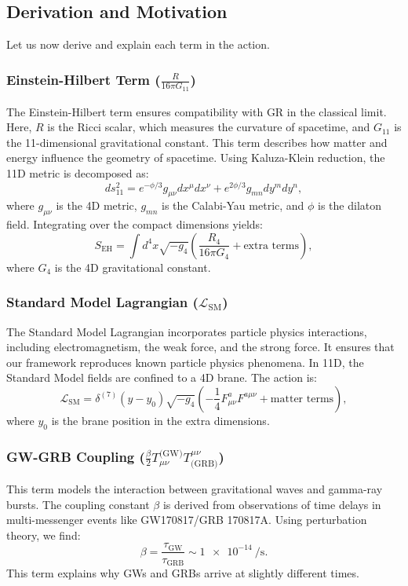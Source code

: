 \documentclass[12pt, a4paper]{article}
\begin{document}
\subsection{Derivation and Motivation}
Let us now derive and explain each term in the action.

\subsubsection{Einstein-Hilbert Term ($\frac{R}{16\pi G_{11}}$)}
The Einstein-Hilbert term ensures compatibility with GR in the classical limit. Here, \(R\) is the Ricci scalar, which measures the curvature of spacetime, and \(G_{11}\) is the 11-dimensional gravitational constant. This term describes how matter and energy influence the geometry of spacetime. Using Kaluza-Klein reduction, the 11D metric is decomposed as:
\[
ds^2_{11} = e^{-\phi/3} g_{\mu\nu}dx^\mu dx^\nu + e^{2\phi/3} g_{mn}dy^m dy^n,
\]
where \(g_{\mu\nu}\) is the 4D metric, \(g_{mn}\) is the Calabi-Yau metric, and \(\phi\) is the dilaton field. Integrating over the compact dimensions yields:
\[
S_{\text{EH}} = \int d^4x \sqrt{-g_4} \left( \frac{R_4}{16\pi G_4} + \text{extra terms} \right),
\]
where \(G_4\) is the 4D gravitational constant.

\subsubsection{Standard Model Lagrangian ($\mathcal{L}_{\text{SM}}$)}
The Standard Model Lagrangian incorporates particle physics interactions, including electromagnetism, the weak force, and the strong force. It ensures that our framework reproduces known particle physics phenomena. In 11D, the Standard Model fields are confined to a 4D brane. The action is:
\[
\mathcal{L}_{\text{SM}} = \delta^{(7)}(y - y_0) \sqrt{-g_4} \left( -\frac{1}{4} F_{\mu\nu}^a F^{a\mu\nu} + \text{matter terms} \right),
\]
where \(y_0\) is the brane position in the extra dimensions.

\subsubsection{GW-GRB Coupling ($\frac{\beta}{2} T_{\mu\nu}^{\text{(GW)}} T^{\mu\nu}_{\text{(GRB)}}$)}
This term models the interaction between gravitational waves and gamma-ray bursts. The coupling constant \(\beta\) is derived from observations of time delays in multi-messenger events like GW170817/GRB 170817A. Using perturbation theory, we find:
\[
\beta = \frac{\tau_{\text{GW}}}{\tau_{\text{GRB}}} \sim \SI{1e-14}{\per\second}.
\]
This term explains why GWs and GRBs arrive at slightly different times.
\end{document}
